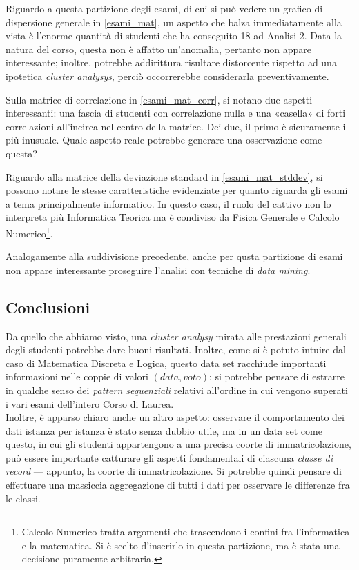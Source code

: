                 Riguardo a questa partizione degli esami, di cui si può vedere un grafico di dispersione generale in \ref{esami_mat}, un aspetto che balza immediatamente alla vista è l’enorme quantità di studenti che ha conseguito 18 ad Analisi 2. Data la natura del corso, questa non è affatto un'anomalia, pertanto non appare interessante; inoltre, potrebbe addirittura risultare distorcente rispetto ad una ipotetica \textit{cluster analysys}, perciò occorrerebbe considerarla preventivamente.

                Sulla matrice di correlazione in \ref{esami_mat_corr}, si notano due aspetti interessanti: una fascia di studenti con correlazione nulla e una «casella» di forti correlazioni all’incirca nel centro della matrice. Dei due, il primo è sicuramente il più inusuale. Quale aspetto reale potrebbe generare una osservazione come questa?

                Riguardo alla matrice della deviazione standard in \ref{esami_mat_stddev}, si possono notare le stesse caratteristiche evidenziate per quanto riguarda gli esami a tema principalmente informatico. In questo caso, il ruolo del cattivo non lo interpreta più Informatica Teorica ma è condiviso da Fisica Generale e Calcolo Numerico\footnote{Calcolo Numerico tratta argomenti che trascendono i confini fra l’informatica e la matematica. Si è scelto d'inserirlo in questa partizione, ma è stata una decisione puramente arbitraria.}.

                Analogamente alla suddivisione precedente, anche per qusta partizione di esami non appare interessante proseguire l'analisi con tecniche di \textit{data mining}.

        \subsection{Conclusioni}

            Da quello che abbiamo visto, una \textit{cluster analysy} mirata alle prestazioni generali degli studenti potrebbe dare buoni risultati. Inoltre, come si è potuto intuire dal caso di Matematica Discreta e Logica, questo data set racchiude importanti informazioni nelle coppie di valori $(data, voto)$: si potrebbe pensare di estrarre in qualche senso dei \textit{pattern sequenziali} relativi all'ordine in cui vengono superati i vari esami dell'intero Corso di Laurea. \\

            Inoltre, è apparso chiaro anche un altro aspetto: osservare il comportamento dei dati istanza per istanza è stato senza dubbio utile, ma in un data set come questo, in cui gli studenti appartengono a una precisa coorte di immatricolazione, può essere importante catturare gli aspetti fondamentali di ciascuna \textit{classe di record} --- appunto, la coorte di immatricolazione. Si potrebbe quindi pensare di effettuare una massiccia aggregazione di tutti i dati per osservare le differenze fra le classi.


